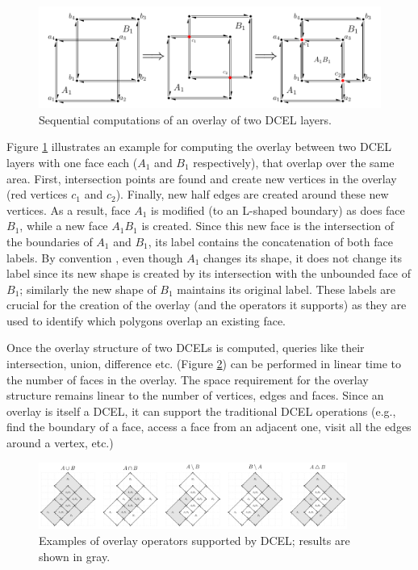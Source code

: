 \begin{figure}
    \centering
    \includegraphics[width=\linewidth]{figures/dcel_seq/dcel2}
    \caption{Sequential computations of an overlay of two DCEL layers.}\label{fig:dcel_seq}
\end{figure}

Figure \ref{fig:dcel_seq} illustrates an example for computing the overlay between two DCEL layers with one face each ($A_1$ and $B_1$ respectively), that overlap over the same area. First, intersection points are found and create new vertices in the overlay (red vertices $c_1$ and $c_2$). Finally, new half edges are created around these new vertices. 
As a result, face $A_1$ is modified (to an L-shaped boundary) as does face $B_1$, while a new face $A_1B_1$ is created. 
Since this new face is the intersection of the boundaries of $A_1$ and $B_1$, its label contains the concatenation of both face labels. 
By convention \cite{berg_computational_2008}, even though $A_1$ changes its shape, it does not change its label since its new shape is created by its intersection with the unbounded face of $B_1$; similarly the new shape of $B_1$ maintains its original label. 
These labels are crucial for the creation of the overlay (and the operators it supports) as they are used to identify which polygons overlap an existing face.

Once the overlay structure of two DCELs is computed, queries like their intersection, union, difference etc. (Figure \ref{fig:dcel_operators}) can be performed in linear time to the number of faces in the overlay. 
The space requirement for the overlay structure remains linear to the number of vertices, edges and faces.  
Since an overlay is itself a DCEL, it can support the traditional DCEL operations (e.g., find the boundary of a face, access a face from an adjacent one, visit all the edges around a vertex, etc.)

\begin{figure}
    \centering
    \includegraphics[width=0.9\textwidth]{figures/dcel_operators/dcel_operators.pdf}
    \caption{Examples of overlay operators supported by DCEL; results are shown in gray.}
    \label{fig:dcel_operators}
\end{figure}

